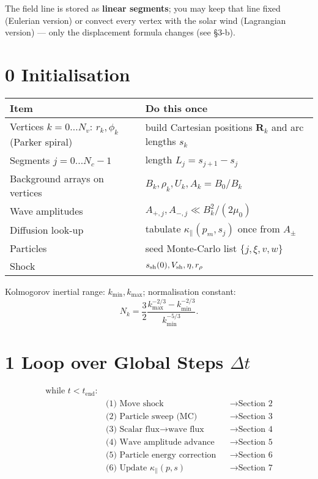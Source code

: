 The field line is stored as \textbf{linear segments}; you may keep that line fixed (Eulerian version) or convect every vertex with the solar wind (Lagrangian version) — only the displacement formula changes (see §3-b).

\section*{0 Initialisation}

\begin{tabular}{|l|l|}
\hline
\textbf{Item} & \textbf{Do this once} \\
\hline
Vertices $k = 0 \dots N_v$: $r_k, \phi_k$ (Parker spiral) & build Cartesian positions $\mathbf{R}_k$ and arc lengths $s_k$ \\
Segments $j = 0 \dots N_c - 1$ & length $L_j = s_{j+1} - s_j$ \\
Background arrays on vertices & $B_k, \rho_k, U_k, A_k = B_0 / B_k$ \\
Wave amplitudes & $A_{+,j}, A_{-,j} \ll B_k^2 / (2 \mu_0)$ \\
Diffusion look-up & tabulate $\kappa_\parallel(p_m, s_j)$ once from $A_\pm$ \\
Particles & seed Monte-Carlo list $\{j, \xi, v, w\}$ \\
Shock & $s_{\rm sh}(0), V_{\rm sh}, \eta, r_{\rho}$ \\
\hline
\end{tabular}

\medskip

Kolmogorov inertial range: $k_{\min}, k_{\max}$; normalisation constant:
\[
N_k = \frac{3}{2} \frac{k_{\max}^{-2/3} - k_{\min}^{-2/3}}{k_{\min}^{-5/3}}.
\]

\section*{1 Loop over Global Steps $\Delta t$}
\begin{align*}
\text{while } t < t_{\text{end}}: \\
\quad & \text{(1) Move shock}                      && \rightarrow \text{Section 2} \\
\quad & \text{(2) Particle sweep (MC)}             && \rightarrow \text{Section 3} \\
\quad & \text{(3) Scalar flux} \to \text{wave flux} && \rightarrow \text{Section 4} \\
\quad & \text{(4) Wave amplitude advance}          && \rightarrow \text{Section 5} \\
\quad & \text{(5) Particle energy correction}      && \rightarrow \text{Section 6} \\
\quad & \text{(6) Update } \kappa_\parallel(p, s)  && \rightarrow \text{Section 7}
\end{align*}

